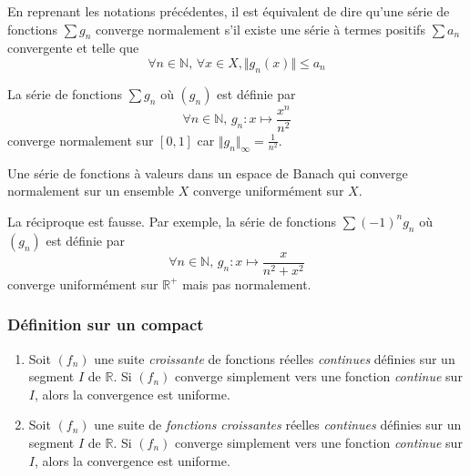   \begin{remark}
    En reprenant les notations précédentes, il est équivalent de dire qu'une série de fonctions $\sum g_n$ converge normalement s'il existe une série à termes positifs $\sum a_n$ convergente et telle que
    \[ \forall n \in \mathbb{N}, \, \forall x \in X, \Vert g_n(x) \Vert \leq a_n \]
  \end{remark}

  \begin{example}
    La série de fonctions $\sum g_n$ où $(g_n)$ est définie par
    \[ \forall n \in \mathbb{N}, \, g_n : x \mapsto \frac{x^n}{n^2} \]
    converge normalement sur $[0,1]$ car $\Vert g_n \Vert_\infty = \frac{1}{n^2}$.
  \end{example}

  \begin{theorem}
    Une série de fonctions à valeurs dans un espace de Banach qui converge normalement sur un ensemble $X$ converge uniformément sur $X$.
  \end{theorem}

  \begin{cexample}
    La réciproque est fausse. Par exemple, la série de fonctions $\sum (-1)^n g_n$ où $(g_n)$ est définie par
    \[ \forall n \in \mathbb{N}, \, g_n : x \mapsto \frac{x}{n^2 + x^2} \]
    converge uniformément sur $\mathbb{R}^+$ mais pas normalement.
  \end{cexample}

  \subsubsection{Définition sur un compact}


  \begin{theorem}
    \begin{enumerate}[label={\bfseries(\roman*)}]
      \item Soit $(f_n)$ une suite \textit{croissante} de fonctions réelles \textit{continues} définies sur un segment $I$ de $\mathbb{R}$. Si $(f_n)$ converge simplement vers une fonction \textit{continue} sur $I$, alors la convergence est uniforme.
      \item Soit $(f_n)$ une suite de \textit{fonctions croissantes} réelles \textit{continues} définies sur un segment $I$ de $\mathbb{R}$. Si $(f_n)$ converge simplement vers une fonction \textit{continue} sur $I$, alors la convergence est uniforme.
    \end{enumerate}
  \end{theorem}

